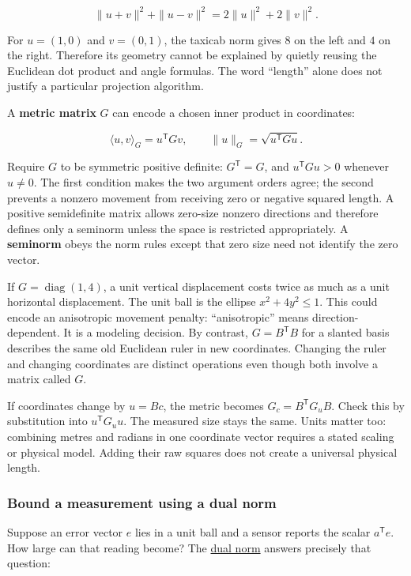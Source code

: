 \[
\|u+v\|^2+\|u-v\|^2=2\|u\|^2+2\|v\|^2.
\]

For \(u=(1,0)\) and \(v=(0,1)\), the taxicab norm gives \(8\) on the left and \(4\) on the right. Therefore its geometry cannot be explained by quietly reusing the Euclidean dot product and angle formulas. The word ``length'' alone does not justify a particular projection algorithm.

A \textbf{metric matrix} \(G\) can encode a chosen inner product in coordinates:

\[
\langle u,v\rangle_G=u^{\mathsf T}Gv,\qquad
\|u\|_G=\sqrt{u^{\mathsf T}Gu}.
\]

Require \(G\) to be symmetric positive definite: \(G^{\mathsf T}=G\), and \(u^{\mathsf T}Gu>0\) whenever \(u\ne0\). The first condition makes the two argument orders agree; the second prevents a nonzero movement from receiving zero or negative squared length. A positive semidefinite matrix allows zero-size nonzero directions and therefore defines only a seminorm unless the space is restricted appropriately. A \textbf{seminorm} obeys the norm rules except that zero size need not identify the zero vector.

If \(G=\operatorname{diag}(1,4)\), a unit vertical displacement costs twice as much as a unit horizontal displacement. The unit ball is the ellipse \(x^2+4y^2\le1\). This could encode an anisotropic movement penalty: ``anisotropic'' means direction-dependent. It is a modeling decision. By contrast, \(G=B^{\mathsf T}B\) for a slanted basis describes the same old Euclidean ruler in new coordinates. Changing the ruler and changing coordinates are distinct operations even though both involve a matrix called \(G\).

If coordinates change by \(u=Bc\), the metric becomes \(G_c=B^{\mathsf T}G_uB\). Check this by substitution into \(u^{\mathsf T}G_uu\). The measured size stays the same. Units matter too: combining metres and radians in one coordinate vector requires a stated scaling or physical model. Adding their raw squares does not create a universal physical length.

\subsubsection{Bound a measurement using a dual norm}\label{01-foundations-i-ch017-bound-a-measurement-using-a-dual-norm}

Suppose an error vector \(e\) lies in a unit ball and a sensor reports the scalar \(a^{\mathsf T}e\). How large can that reading become? The \hyperref[appendix-d6d9dbbe3c14]{dual norm} answers precisely that question:

